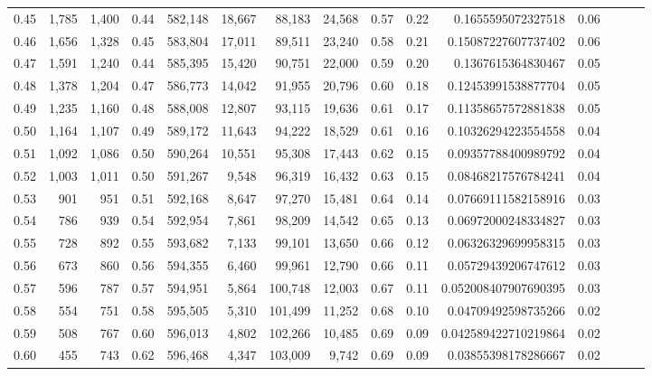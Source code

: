 \begin{tabular}{rrrrrrrrrrrrrrr}
0.45 &   1,785 &  1,400 &  0.44 &  582,148 &   18,667 &   88,183 &   24,568 &  0.57 &  0.22 &      0.1655595072327518 &      0.06 \\
0.46 &   1,656 &  1,328 &  0.45 &  583,804 &   17,011 &   89,511 &   23,240 &  0.58 &  0.21 &     0.15087227607737402 &      0.06 \\
0.47 &   1,591 &  1,240 &  0.44 &  585,395 &   15,420 &   90,751 &   22,000 &  0.59 &  0.20 &      0.1367615364830467 &      0.05 \\
0.48 &   1,378 &  1,204 &  0.47 &  586,773 &   14,042 &   91,955 &   20,796 &  0.60 &  0.18 &     0.12453991538877704 &      0.05 \\
0.49 &   1,235 &  1,160 &  0.48 &  588,008 &   12,807 &   93,115 &   19,636 &  0.61 &  0.17 &     0.11358657572881838 &      0.05 \\
0.50 &   1,164 &  1,107 &  0.49 &  589,172 &   11,643 &   94,222 &   18,529 &  0.61 &  0.16 &     0.10326294223554558 &      0.04 \\
0.51 &   1,092 &  1,086 &  0.50 &  590,264 &   10,551 &   95,308 &   17,443 &  0.62 &  0.15 &     0.09357788400989792 &      0.04 \\
0.52 &   1,003 &  1,011 &  0.50 &  591,267 &    9,548 &   96,319 &   16,432 &  0.63 &  0.15 &     0.08468217576784241 &      0.04 \\
0.53 &     901 &    951 &  0.51 &  592,168 &    8,647 &   97,270 &   15,481 &  0.64 &  0.14 &     0.07669111582158916 &      0.03 \\
0.54 &     786 &    939 &  0.54 &  592,954 &    7,861 &   98,209 &   14,542 &  0.65 &  0.13 &     0.06972000248334827 &      0.03 \\
0.55 &     728 &    892 &  0.55 &  593,682 &    7,133 &   99,101 &   13,650 &  0.66 &  0.12 &     0.06326329699958315 &      0.03 \\
0.56 &     673 &    860 &  0.56 &  594,355 &    6,460 &   99,961 &   12,790 &  0.66 &  0.11 &     0.05729439206747612 &      0.03 \\
0.57 &     596 &    787 &  0.57 &  594,951 &    5,864 &  100,748 &   12,003 &  0.67 &  0.11 &    0.052008407907690395 &      0.03 \\
0.58 &     554 &    751 &  0.58 &  595,505 &    5,310 &  101,499 &   11,252 &  0.68 &  0.10 &     0.04709492598735266 &      0.02 \\
0.59 &     508 &    767 &  0.60 &  596,013 &    4,802 &  102,266 &   10,485 &  0.69 &  0.09 &    0.042589422710219864 &      0.02 \\
0.60 &     455 &    743 &  0.62 &  596,468 &    4,347 &  103,009 &    9,742 &  0.69 &  0.09 &     0.03855398178286667 &      0.02 \\

\end{tabular}
